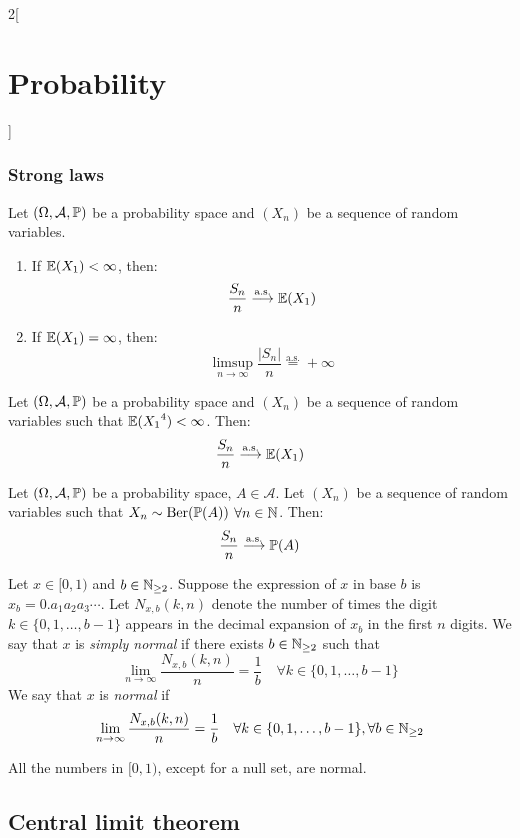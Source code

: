 \documentclass[../../../main_math.tex]{subfiles}
\begin{document}
\begin{multicols}{2}[\section{Probability}]
  \subsubsection{Strong laws}
  \begin{theorem}\label{P:stronglawKolmo}
    Let $(\Omega,\mathcal{A},\mathbb{P})$ be a probability space and $(X_n)$ be a sequence of \iid random variables.
    \begin{enumerate}
      \item If $\mathbb{E}(X_1)<\infty$, then: $$\frac{S_n}{n}\overset{\text{a.s.}}{\longrightarrow}\mathbb{E}(X_1)$$
      \item If $\mathbb{E}(X_1)=\infty$, then: $$\limsup_{n\to\infty}\frac{|S_n|}{n}\overset{\text{a.s.}}{=}+\infty$$
    \end{enumerate}
  \end{theorem}
  \begin{theorem}
    Let $(\Omega,\mathcal{A},\mathbb{P})$ be a probability space and $(X_n)$ be a sequence of \iid random variables such that $\mathbb{E}({X_1}^4)<\infty$. Then: $$\frac{S_n}{n}\overset{\text{a.s.}}{\longrightarrow}\mathbb{E}(X_1)$$
  \end{theorem}
  \begin{corollary}
    Let $(\Omega,\mathcal{A},\mathbb{P})$ be a probability space, $A\in\mathcal{A}$. Let $(X_n)$ be a sequence of \iid random variables such that $X_n\sim\text{Ber}(\mathbb{P}(A))$ $\forall n\in\mathbb{N}$. Then: $$\frac{S_n}{n}\overset{\text{a.s.}}{\longrightarrow}\mathbb{P}(A)$$
  \end{corollary}
  \begin{definition}
    Let $x\in[0,1)$ and $b\in\mathbb{N}_{\geq 2}$. Suppose the expression of $x$ in base $b$ is $x_b=0.a_1a_2a_3\cdots$. Let $N_{x,b}(k,n)$ denote the number of times the digit $k\in\{0,1,\ldots,b-1\}$ appears in the decimal expansion of $x_b$ in the first $n$ digits. We say that $x$ is \emph{simply normal} if there exists $b\in\mathbb{N}_{\geq 2}$ such that $$\lim_{n\to\infty}\frac{N_{x,b}(k,n)}{n}=\frac{1}{b}\quad\forall k\in\{0,1,\ldots,b-1\}$$
    We say that $x$ is \emph{normal} if $$\lim_{n\to\infty}\frac{N_{x,b}(k,n)}{n}=\frac{1}{b}\quad\forall k\in\{0,1,\ldots,b-1\}, \forall b\in\mathbb{N}_{\geq 2}$$
  \end{definition}
  \begin{theorem}
    All the numbers in $[0,1)$, except for a null set, are normal.
  \end{theorem}
  \subsection{Central limit theorem}

\end{multicols}
\end{document}
